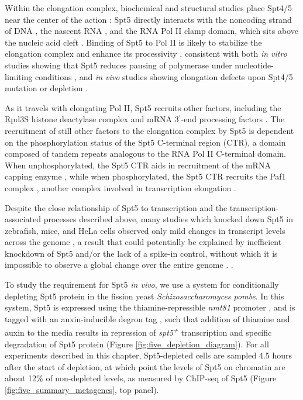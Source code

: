 Within the elongation complex, biochemical and structural studies place Spt4/5 near the center of the action \citep{vos2018a, vos2018b, ehara2017, ehara2019}: Spt5 directly interacts with the noncoding strand of DNA \citep{crickard2016,meyer2015}, the nascent RNA \citep{blythe2016, crickard2016,meyer2015}, and the RNA Pol II clamp domain, which sits above the nucleic acid cleft \citep{hirtreiter2010, martinez-rucobo2011, viktorovskaya2011, yamaguchi1999}.
Binding of Spt5 to Pol II is likely to stabilize the elongation complex and enhance its processivity \citep{hirtreiter2010,klein2011,martinez-rucobo2011,baluapuri2019}, consistent with both \textit{in vitro} studies showing that Spt5 reduces pausing of polymerase under nucleotide-limiting conditions \citep{guo2000,wada1998,zhu2007}, and \textit{in vivo} studies showing elongation defects upon Spt4/5 mutation or depletion \citep{diamant2016,kramer2016,liu2012,mason2005,morillon2003,quan2010,rondon2003}.

As it travels with elongating Pol II, Spt5 recruits other factors, including the Rpd3S histone deactylase complex \citep{drouin2010} and mRNA 3$^\prime$-end processing factors \citep{mayer2012, stadelmayer2014, yamamoto2014}.
The recruitment of still other factors to the elongation complex by Spt5 is dependent on the phosphorylation status of the Spt5 C-terminal region (CTR), a domain composed of tandem repeats analogous to the RNA Pol II C-terminal domain.
When unphosphorylated, the Spt5 CTR aids in recruitment of the mRNA capping enzyme \citep{doamekpor2014, doamekpor2015, schneider2010, wen1999}, while when phosphorylated, the Spt5 CTR recruits the Paf1 complex \citep{liu2009, mbogning2013, wier2013, zhou2009}, another complex involved in transcription elongation \citep{vanoss2017}.

Despite the close relationship of Spt5 to transcription and the transcription-associated processes described above, many studies which knocked down Spt5 in zebrafish, mice, and HeLa cells observed only mild changes in transcript levels across the genome \citep{diamant2016b, komori2009, krishnan2008, stanlie2012, fitz2018}, a result that could potentially be explained by inefficient knockdown of Spt5 and/or the lack of a spike-in control, without which it is impossible to observe a global change over the entire genome \citep{chen2016}. \citep{henriques2018, naguib2019}.

To study the requirement for Spt5 \textit{in vivo}, we use a system for conditionally depleting Spt5 protein in the fission yeast \textit{Schizosaccharomyces pombe}.
In this system, Spt5 is expressed using the thiamine-repressible \textit{nmt81} promoter \citep{basi1993}, and is tagged with an auxin-inducible degron tag \citep{kanke2011}, such that addition of thiamine and auxin to the media results in repression of \textit{spt5\textsuperscript{+}} transcription and specific degradation of Spt5 protein (Figure \ref{fig:five_depletion_diagram}).
For all experiments described in this chapter, Spt5-depleted cells are sampled 4.5 hours after the start of depletion, at which point the levels of Spt5 on chromatin are about 12\% of non-depleted levels, as measured by ChIP-seq of Spt5 (Figure \ref{fig:five_summary_metagenes}, top panel).

